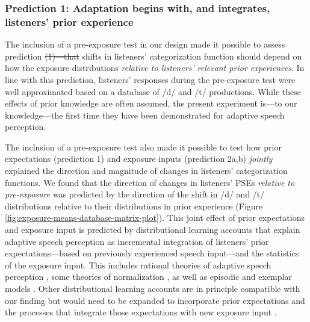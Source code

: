 \documentclass[
  11pt,
  man,mask,floatsintext]{apa6}
\makeatletter
\providecommand{\DIFadd}[1]{{\protect\color{blue}\uwave{#1}}} %
\providecommand{\DIFdel}[1]{{\protect\color{red}\sout{#1}}} %
\providecommand{\DIFaddbegin}{} %
\providecommand{\DIFaddend}{} %
\providecommand{\DIFdelbegin}{} %
\providecommand{\DIFdelend}{} %
\newcommand{\DIFscaledelfig}{0.5}
\newlength{\DIFdelgraphicswidth} %
\newlength{\DIFdelgraphicsheight} %
\newcommand{\DIFaddincludegraphics}[2][]{{\color{blue}\fbox{\DIFOincludegraphics[#1]{#2}}}} %
\newcommand{\DIFdelincludegraphics}[2][]{%
\sbox{\DIFdelgraphicsbox}{\DIFOincludegraphics[#1]{#2}}%
\settoboxwidth{\DIFdelgraphicswidth}{\DIFdelgraphicsbox} %
\settoboxtotalheight{\DIFdelgraphicsheight}{\DIFdelgraphicsbox} %
\scalebox{\DIFscaledelfig}{%
\parbox[b]{\DIFdelgraphicswidth}{\usebox{\DIFdelgraphicsbox}\\[-\baselineskip] \rule{\DIFdelgraphicswidth}{0em}}\llap{\resizebox{\DIFdelgraphicswidth}{\DIFdelgraphicsheight}{%
\setlength{\unitlength}{\DIFdelgraphicswidth}%
\begin{picture}(1,1)%
\thicklines\linethickness{2pt} %
{\color[rgb]{1,0,0}\put(0,0){\framebox(1,1){}}}%
{\color[rgb]{1,0,0}\put(0,0){\line( 1,1){1}}}%
{\color[rgb]{1,0,0}\put(0,1){\line(1,-1){1}}}%
\end{picture}%
}\hspace*{3pt}}} %
} %
\DeclareRobustCommand{\DIFaddbegin}{\DIFOaddbegin \let\includegraphics\DIFaddincludegraphics} %
\DeclareRobustCommand{\DIFaddend}{\DIFOaddend \let\includegraphics\DIFOincludegraphics} %
\DeclareRobustCommand{\DIFdelbegin}{\DIFOdelbegin \let\includegraphics\DIFdelincludegraphics} %
\DeclareRobustCommand{\DIFdelend}{\DIFOaddend \let\includegraphics\DIFOincludegraphics} %
\let\sout@orig\sout %
\renewcommand{\sout}[1]{\ifmmode\text{\sout@orig{\ensuremath{#1}}}\else\sout@orig{#1}\fi} %
\makeatother
\begin{document}
\subsubsection{Prediction 1: Adaptation begins with, and integrates, listeners' prior experience}\label{prediction-1-adaptation-begins-with-and-integrates-listeners-prior-experience}

The inclusion of a pre-exposure test in our design made it possible to assess prediction \DIFdelbegin \DIFdel{(1)---that }\DIFdelend \DIFaddbegin \DIFadd{1---that }\DIFaddend shifts in listeners' categorization function should depend on how the exposure distributions \emph{relative to listeners' relevant prior experiences}. In line with this prediction, listeners' responses during the pre-exposure test were well approximated based on a database of /d/ and /t/ productions. While these effects of prior knowledge are often assumed, the present experiment is---to our knowledge---the first time they have been demonstrated for adaptive speech perception.

The inclusion of a pre-exposure test also made it possible to test how prior expectations (prediction 1) and exposure inputs (prediction 2a,b) \emph{jointly} explained the direction and magnitude of changes in listeners' categorization functions. We found that the direction of changes in listeners' PSEs \emph{relative to pre-exposure} was predicted by the direction of the shift in /d/ and /t/ distributions relative to their distributions in prior experience (Figure \ref{fig:exposure-means-database-matrix-plot}). This joint effect of prior expectations and exposure input is predicted by distributional learning accounts that explain adaptive speech perception as incremental integration of listeners' prior expectations---based on previously experienced speech input---and the statistics of the exposure input. This includes rational theories of adaptive speech perception \autocites[e.g., the ideal adaptor framework,][]{kleinschmidt-jaeger2015,kleinschmidt-jaeger2016}, some theories of normalization \autocite[e.g., the probabilistic sliding template model,][]{nearey-assmann2007}, as well as episodic \autocite{goldinger1998} and exemplar models \autocite{johnson1997}. Other distributional learning accounts are in principle compatible with our finding but would need to be expanded to incorporate prior expectations and the processes that integrate those expectations with new exposure input \autocites[e.g.,][]{bejjanki2011,mcmurray-jongman2011}[see discussion in][]{persson2024,xie2023}.
\end{document}

